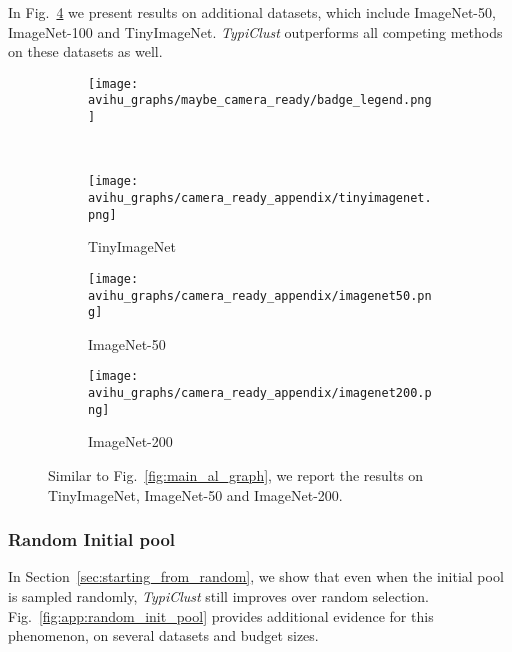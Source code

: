 \documentclass{article}
\begin{document}
In Fig.~\ref{fig:app_more_imagenet} we present results on additional datasets, which include ImageNet-50, ImageNet-100 and TinyImageNet.
\emph{TypiClust} outperforms all competing methods on these datasets as well.


\begin{figure}[thb!]
\begin{center}
\begin{subfigure}{.45\textwidth}
  \centering
 \texttt{[image: avihu\_graphs/maybe\_camera\_ready/badge\_legend.png]}
\end{subfigure}
\\
    \begin{subfigure}{.157\textwidth}
      \centering
      \texttt{[image: avihu\_graphs/camera\_ready\_appendix/tinyimagenet.png]}
\caption{TinyImageNet}
    \label{fig:app_more_tinyimagenet}
    \end{subfigure}
    \begin{subfigure}{.157\textwidth}
      \centering
      \texttt{[image: avihu\_graphs/camera\_ready\_appendix/imagenet50.png]}
\caption{ImageNet-50}
    \label{fig:app_more_imagenet_50}
    \end{subfigure}
    \begin{subfigure}{.157\textwidth}
      \centering
      \texttt{[image: avihu\_graphs/camera\_ready\_appendix/imagenet200.png]}
\caption{ImageNet-200}
    \label{fig:app_more_imagenet_100}
    \end{subfigure}
\caption{Similar to Fig.~\ref{fig:main_al_graph}, we report the results on TinyImageNet, ImageNet-50 and ImageNet-200.
}
\label{fig:app_more_imagenet}
\end{center}
\vspace{-.6cm}
\end{figure}

\subsubsection{Random Initial pool}
In Section~\ref{sec:starting_from_random}, we show that even when the initial pool is sampled randomly, \emph{TypiClust} still improves over random selection. Fig.~\ref{fig:app:random_init_pool} provides additional evidence for this phenomenon, on several datasets and budget sizes. 
\end{document}
